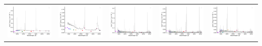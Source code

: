 \begin{center}
\begin{longtable}{l l l l l }
    \includegraphics[width=0.19\linewidth, clip]{Figs/Figs-sdss/spec-0406-51817-0160-STRIPE82-0052-004127.pdf} & \includegraphics[width=0.19\linewidth, clip]{Figs/Figs-sdss/spec-0518-52282-0022-SPLUS-n02n26-033149.pdf} & \includegraphics[width=0.19\linewidth, clip]{Figs/Figs-sdss/spec-0686-52519-0104-STRIPE82-0005-024320.pdf} & \includegraphics[width=0.19\linewidth, clip]{Figs/Figs-sdss/spec-0705-52200-0577-STRIPE82-0056-038958.pdf} & \includegraphics[width=0.19\linewidth, clip]{Figs/Figs-sdss/spec-1023-52818-0521-STRIPE82-0106-057954.pdf} \\

\end{longtable}
\end{center}
